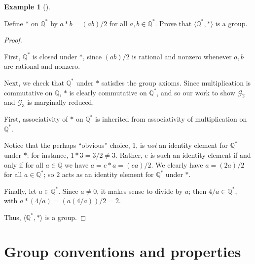 \documentclass[10pt,]{book}
\theoremstyle{plain}
\theoremstyle{definition}
\theoremstyle{definition}
\theoremstyle{definition}
\newtheorem{example}[theorem]{Example}
\theoremstyle{definition}
\numberwithin{equation}{section}
\def\Q{\mathbb{Q}}
\def\G{\mathcal{G}}
\begin{document}
  \begin{example}[]\label{example-14}

        Define \(*\) on \(\Q^*\) by \(a*b=(ab)/2\) for all \(a,b\in \Q^*\). Prove that \(\langle \Q^*,*\rangle\) is a group.
\begin{proof}\hypertarget{proof-9}{}

        First, \(\Q^*\) is closed under \(*\), since \((ab)/2\) is
        rational and nonzero whenever \(a,b\) are rational and nonzero.
\par

        Next, we check that \(\Q^*\) under \(*\) satisfies the group
        axioms. Since multiplication is commutative on \(\Q\), \(*\) is
        clearly commutative on \(\Q^*\), and so our work to show
        \(\G_2\) and \(\G_3\) is marginally reduced.%
\par

       First, associativity of \(*\) on \(\Q^*\) is inherited
              from associativity of multiplication on \(\Q^*\).%
\par
 Notice that the perhaps ``obvious'' choice, 1, is
              \emph{not} an identity element for \(\Q^*\) under
              \(*\): for instance, \(1*3=3/2 \neq 3\). Rather, \(e\) is such an
              identity element if and only if for all \(a\in \Q\) we
              have \(a=e*a=(ea)/2\). We clearly have \(a=(2a)/2\) for all
              \(a\in \Q^*\); so \(2\) acts as an identity element for
              \(\Q^*\) under \(*\).
\par

              Finally, let \(a\in \Q^*\).  Since \(a\neq 0\), it makes
              sense to divide by \(a\); then \(4/a\in \Q^*\), with
              \(a*(4/a)=(a(4/a))/2=2\).
\par

        Thus, \(\langle \Q^*,*\rangle\) is a group.
\end{proof}
\end{example}

%
\typeout{************************************************}
\typeout{************************************************}
\section[{Group conventions and properties}]{Group conventions and properties}\label{section-7}
\typeout{************************************************}
\typeout{************************************************}
\end{document}
